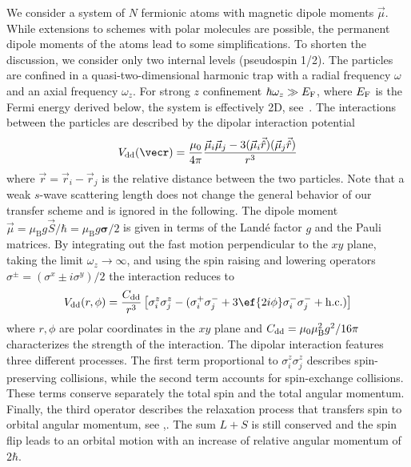 We consider a system of $N$ fermionic atoms with magnetic dipole moments $\vec{\mu}$. While extensions to schemes with polar molecules are possible, the permanent dipole moments of the atoms lead to some simplifications.
To shorten the discussion, we consider only two internal levels (pseudospin 1/2). The particles are confined in a quasi-two-dimensional harmonic trap with a radial frequency $\omega$ and an axial frequency $\omega_z$. For strong $z$ confinement $\hbar\omega_z \gg E_\text{F}$, where $E_\text{F}$ is the Fermi energy derived below, the system is effectively 2D, see~.
The interactions between the particles are described by the dipolar interaction potential
\begin{align*}
\Vdd(\vecr) = \frac{\mu_0}{4\pi}\frac{\vec{\mu}_i  \vec{\mu}_j - 3(\vec{\mu}_i  \vec{\hat{r}})(\vec{\mu}_j \vec{\hat{r}})}{r^3}
\end{align*}
where $\vec{r}=\vec{r}_i-\vec{r}_j$ is the relative distance between the two particles.
Note that a weak $s$-wave scattering length does not change the general behavior of our transfer scheme and is ignored in the following.
The dipole moment $\vec{\mu} =  \mu_\text{B}g \vec{S} / \hbar = \mu_\text{B}g {\boldsymbol\sigma}/2$ is given in terms of the Land\'e factor $g$ and the Pauli matrices. By integrating out the fast motion perpendicular to the $xy$ plane, taking the limit $\omega_z\rightarrow\infty$, and using the spin raising and lowering operators $\sigma^{\pm} = (\sigma^x \pm i \sigma^y)/2$ the interaction reduces to
\begin{align*}
\Vdd(r,\phi) =  \frac{\Cdd}{r^3} \left[
\sigma^z_i \sigma^z_j - (\sigma^+_i \sigma^-_j +3 \ef{2i\phi} \sigma^-_i \sigma^-_j  +\text{h.c.})
\right]
\end{align*}
where $r,\phi$ are polar coordinates in the $xy$ plane and $C_\text{dd} = \mu_0 \mu_\text{B}^2 g^2 / 16\pi$  characterizes the strength of the interaction. The dipolar interaction features three different processes. The first term proportional to $\sigma^z_i\sigma^z_j$ describes spin-preserving collisions, while the second term  accounts for spin-exchange collisions. These terms conserve separately the total spin and the total angular momentum.  Finally, the third operator  describes the relaxation process that transfers spin to orbital angular momentum, see ,. The sum $L+S$ is still conserved and the spin flip leads to an orbital motion with an increase of relative angular momentum of $2\hbar$.

